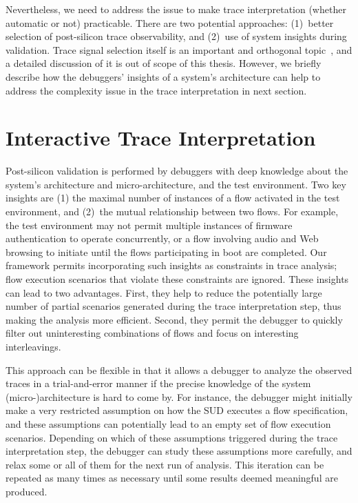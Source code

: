 \documentclass[12pt,frontmatter,copyright,thesis]{usfmanus}
\begin{document}
Nevertheless, we need to address the issue to make trace
interpretation (whether automatic or not) practicable.
There are two potential approaches: (1)~better selection of
post-silicon trace observability, and (2)~use of system
insights during validation.  Trace signal selection itself
is an important and orthogonal topic~\cite{nicolici,basu},
and a detailed discussion of it is out of scope of this
thesis.  However, we briefly describe how the debuggers'
insights of a system's architecture can help to address the
complexity issue in the trace interpretation in next section.

\section{Interactive Trace Interpretation}

Post-silicon validation is performed by debuggers with deep
knowledge about the system's architecture and
micro-architecture, and the test environment.  Two key
insights are (1) the maximal number of instances of a flow
activated in the test environment, and (2)~the mutual
relationship between two flows.  For example, the test
environment may not permit multiple instances of firmware
authentication to operate concurrently, or a flow involving
audio and Web browsing to initiate until the flows
participating in boot are completed.  Our framework permits
incorporating such insights as constraints in trace
analysis; flow execution scenarios that violate these
constraints are ignored.  These insights can lead to two
advantages.  First, they help to reduce the potentially
large number of partial scenarios generated during the trace
interpretation step, thus making the analysis more
efficient.  Second, they permit the debugger to quickly
filter out uninteresting combinations of flows and focus on
interesting interleavings.

This approach can be flexible in that it allows a debugger
to analyze the observed traces in a trial-and-error manner
if the precise knowledge of the system (micro-)architecture
is hard to come by.  For instance, the debugger might
initially make a very restricted assumption on how the SUD
executes a flow specification, and these assumptions can
potentially lead to an empty set of flow execution
scenarios.  Depending on which of these assumptions
triggered during the trace interpretation step, the debugger
can study these assumptions more carefully, and relax some
or all of them for the next run of analysis.  This iteration
can be repeated as many times as necessary until some
results deemed meaningful are produced.
\end{document}
